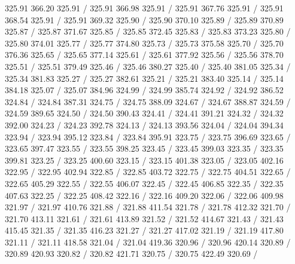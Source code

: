 { 325.91 366.20 325.91 /
 325.91 366.98 325.91 /
 325.91 367.76 325.91 /
 325.91 368.54 325.91 /
 325.91 369.32 325.90 /
 325.90 370.10 325.89 /
 325.89 370.89 325.87 /
 325.87 371.67 325.85 /
 325.85 372.45 325.83 /
 325.83 373.23 325.80 /
 325.80 374.01 325.77 /
 325.77 374.80 325.73 /
 325.73 375.58 325.70 /
 325.70 376.36 325.65 /
 325.65 377.14 325.61 /
 325.61 377.92 325.56 /
 325.56 378.70 325.51 /
 325.51 379.49 325.46 /
 325.46 380.27 325.40 /
 325.40 381.05 325.34 /
 325.34 381.83 325.27 /
 325.27 382.61 325.21 /
 325.21 383.40 325.14 /
 325.14 384.18 325.07 /
 325.07 384.96 324.99 /
 324.99 385.74 324.92 /
 324.92 386.52 324.84 /
 324.84 387.31 324.75 /
 324.75 388.09 324.67 /
 324.67 388.87 324.59 /
 324.59 389.65 324.50 /
 324.50 390.43 324.41 /
 324.41 391.21 324.32 /
 324.32 392.00 324.23 /
 324.23 392.78 324.13 /
 324.13 393.56 324.04 /
 324.04 394.34 323.94 /
 323.94 395.12 323.84 /
 323.84 395.91 323.75 /
 323.75 396.69 323.65 /
 323.65 397.47 323.55 /
 323.55 398.25 323.45 /
 323.45 399.03 323.35 /
 323.35 399.81 323.25 /
 323.25 400.60 323.15 /
 323.15 401.38 323.05 /
 323.05 402.16 322.95 /
 322.95 402.94 322.85 /
 322.85 403.72 322.75 /
 322.75 404.51 322.65 /
 322.65 405.29 322.55 /
 322.55 406.07 322.45 /
 322.45 406.85 322.35 /
 322.35 407.63 322.25 /
 322.25 408.42 322.16 /
 322.16 409.20 322.06 /
 322.06 409.98 321.97 /
 321.97 410.76 321.88 /
 321.88 411.54 321.78 /
 321.78 412.32 321.70 /
 321.70 413.11 321.61 /
 321.61 413.89 321.52 /
 321.52 414.67 321.43 /
 321.43 415.45 321.35 /
 321.35 416.23 321.27 /
 321.27 417.02 321.19 /
 321.19 417.80 321.11 /
 321.11 418.58 321.04 /
 321.04 419.36 320.96 /
 320.96 420.14 320.89 /
 320.89 420.93 320.82 /
 320.82 421.71 320.75 /
 320.75 422.49 320.69 /
}
